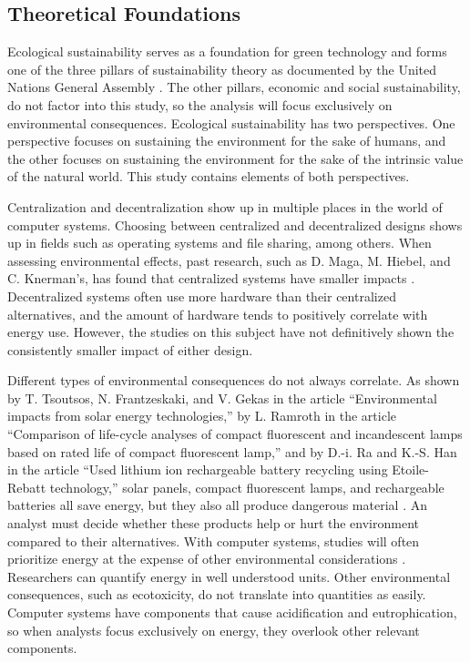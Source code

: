 \documentclass[final,journal,10pt,letterpaper,oneside,twocolumn,compsoc]%
{IEEEtran}
\begin{document}
\subsection{Theoretical Foundations}
Ecological sustainability serves as a foundation for green technology and
forms one of the three pillars of sustainability theory as documented by the
United Nations General Assembly
\cite{un}. The other pillars, economic and social sustainability, do not factor
into this study, so the analysis will focus exclusively on environmental
consequences. Ecological sustainability has two perspectives. One perspective
focuses on sustaining the environment for the sake of humans, and the other
focuses on sustaining the environment for the sake of the intrinsic value of the
natural world. This study contains elements of both perspectives.

Centralization and decentralization show up in multiple places in the world of
computer systems. Choosing between centralized and decentralized designs shows
up in fields such as operating systems and file sharing, among others. When
assessing
environmental effects, past research, such as D. Maga, M. Hiebel, and C.
Knerman's, has found that centralized systems have smaller impacts
\cite{maga}. Decentralized systems often use more hardware than their
centralized alternatives, and the amount of hardware tends to positively
correlate with energy use. However, the studies on this subject have not
definitively shown the consistently smaller impact of either design.

Different types of environmental consequences do not always correlate. As shown
by T. Tsoutsos, N. Frantzeskaki, and V. Gekas in the article ``Environmental
impacts from solar energy
technologies,'' by L. Ramroth in the article ``Comparison of life-cycle analyses
of compact fluorescent and incandescent lamps based on rated life of compact
fluorescent lamp,'' and by D.-i. Ra and K.-S. Han in the article ``Used lithium
ion rechargeable battery recycling using Etoile-Rebatt technology,'' solar
panels, compact fluorescent lamps, and rechargeable batteries all save energy,
but they also all produce dangerous material \cite{solar} \cite{cfl}
\cite{battery}. An analyst must decide whether these products help or hurt the
environment compared to their alternatives. With computer systems, studies will
often prioritize energy at
the expense of other environmental considerations \cite{maga}. Researchers can
quantify energy in well understood units. Other environmental consequences, such
as ecotoxicity, do not translate into quantities as easily. Computer systems
have components that cause acidification and eutrophication,
so when analysts focus exclusively on energy, they overlook other relevant
components.
\end{document}
